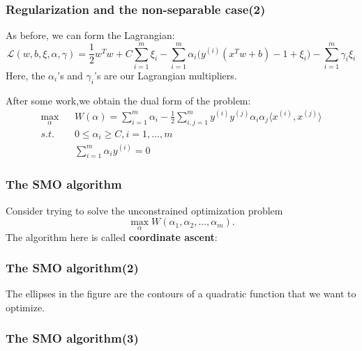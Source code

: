 \documentclass[slidestop,compress,mathserif]{beamer}
\begin{document}
 	\begin{frame}[shrink]
 		\frametitle{Regularization and the non-separable case(2)}
 		As before, we can form the Lagrangian:
 		$$\mathcal{L}(w,b,\xi,\alpha,\gamma)=\frac{1}{2}w^Tw+
 		C\sum_{i=1}^m\xi_i-\sum_{i=1}^m\alpha_i\big(y^{(i)}
 		(x^Tw+b)-1+\xi_i\big)-\sum_{i=1}^m\gamma_i\xi_i$$
 		Here, the $\alpha_i$'s and $\gamma_i$'s are our
 		Lagrangian multipliers.
 		
 		After some work,we obtain the dual form of the problem:
 		\begin{eqnarray*}
 			\max_\alpha && W(\alpha)=\sum_{i=1}^m\alpha_i-
 			\frac{1}{2}\sum_{i,j=1}^my^{(i)}y^{(j)}\alpha_i
 			\alpha_j\langle x^{(i)},x^{(j)}\rangle \\
 			s.t. && 0\le \alpha_i \ge C,i=1,\ldots,m\\
 			&& \sum_{i=1}^m\alpha_iy^{(i)}=0
 		\end{eqnarray*}
	\end{frame} 
	
	\begin{frame}
		\frametitle{The SMO algorithm}
		Consider trying to solve the 
		unconstrained optimization problem
		$$\max_\alpha W(\alpha_1,\alpha_2,\ldots,\alpha_m).$$
		The algorithm here is called \textbf{coordinate ascent}:
		\begin{figure}
        \end{figure}
	\end{frame}
	\begin{frame}
		\frametitle{The SMO algorithm(2)}
		\begin{figure}
        \end{figure}
        The ellipses in the figure are the contours of 
        a quadratic function that we want to optimize.
	\end{frame}
	\begin{frame}
		\frametitle{The SMO algorithm(3)}
		\begin{figure}
        \end{figure}
	\end{frame}
\end{document}
